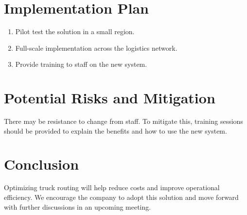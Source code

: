 \documentclass[a4paper,12pt, final]{article}
\begin{document}
\section{Implementation Plan}
\begin{enumerate}
    \item Pilot test the solution in a small region.
    \item Full-scale implementation across the logistics network.
    \item Provide training to staff on the new system.
\end{enumerate}


\section{Potential Risks and Mitigation}
There may be resistance to change from staff. To mitigate this, training sessions should be provided
to explain the benefits and how to use the new system.


\section{Conclusion}
Optimizing truck routing will help reduce costs and improve operational efficiency. We encourage
the company to adopt this solution and move forward with further discussions in an upcoming
meeting.





\end{document}
